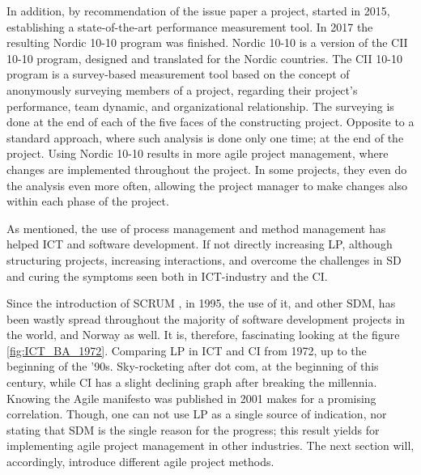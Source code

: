 In addition, by recommendation of the issue paper a project, started in 2015, establishing a state-of-the-art performance measurement tool. In 2017 the resulting Nordic 10-10 \cite{nordic-10-10} program was finished. Nordic 10-10 is a version of the CII 10-10 program\cite{CII-10-10}, designed and translated for the Nordic countries. The CII 10-10 program is a survey-based measurement tool based on the concept of anonymously surveying members of a project, regarding their project's performance, team dynamic, and organizational relationship. The surveying is done at the end of each of the five faces of the constructing project. Opposite to a standard approach, where such analysis is done only one time; at the end of the project. Using Nordic 10-10 results in more agile project management, where changes are implemented throughout the project. In some projects, they even do the analysis even more often, allowing the project manager to make changes also within each phase of the project. 

As mentioned, the use of process management and method management has helped ICT and software development. If not directly increasing LP, although structuring projects, increasing interactions, and overcome the challenges in SD and curing the symptoms seen both in ICT-industry and the CI.  

Since the introduction of SCRUM \cite{scrum}, in 1995, the use of it, and other SDM, has been wastly spread throughout the majority of software development projects in the world, and Norway as well. It is, therefore, fascinating looking at the figure \ref{fig:ICT_BA_1972}. Comparing LP in ICT and CI from 1972, up to the beginning of the '90s. Sky-rocketing after dot com, at the beginning of this century, while CI has a slight declining graph after breaking the millennia. Knowing the Agile manifesto was published in 2001 makes for a promising correlation. Though, one can not use LP as a single source of indication, nor stating that SDM is the single reason for the progress; this result yields for implementing agile project management in other industries. The next section will, accordingly, introduce different agile project methods.

